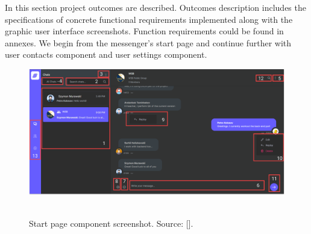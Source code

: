 In this section project outcomes are described.
Outcomes description includes the specifications of concrete functional requirements implemented along with the
graphic user interface screenshots.
Function requirements could be found in annexes.
We begin from the messenger's start page and continue further with user contacts component and user settings component.
\begin{figure}[H]
    \centering
    \includegraphics[width=1\textwidth]{Pictures/09_Messenger_startpage}
    ~\caption{Start page component screenshot. Source: [\cite{mango2021figma}].}\label{fig:figure5}
\end{figure}

